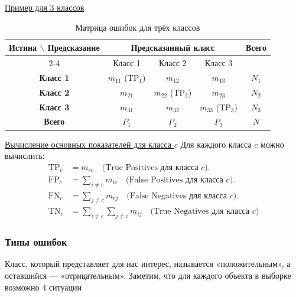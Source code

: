 \underline{Пример для 3 классов}

\begin{table}[h]
    \centering
    \begin{tabular}{|c|c|c|c|c|}
        \hline
        \multirow{2}{*}{\textbf{Истина $\backslash$ Предсказание}} & \multicolumn{3}{c|}{\textbf{Предсказанный класс}}
        & \multirow{2}{*}{\textbf{Всего}} \\ \cline{2-4}
        & Класс 1           & Класс 2           & Класс 3           &       \\ \hline
        \textbf{Класс 1} & $m_{11}$ (TP$_1$) & $m_{12}$          & $m_{13}$          & $N_1$ \\ \hline
        \textbf{Класс 2} & $m_{21}$          & $m_{22}$ (TP$_2$) & $m_{23}$          & $N_2$ \\ \hline
        \textbf{Класс 3} & $m_{31}$          & $m_{32}$          & $m_{33}$ (TP$_3$) & $N_3$ \\ \hline
        \textbf{Всего}   & $P_1$             & $P_2$             & $P_3$             & $N$   \\ \hline
    \end{tabular}
    \caption{Матрица ошибок для трёх классов}
    \label{tab:triple matrix}
\end{table}

\underline{Вычисление основных показателей для класса $c$}
Для каждого класса $c$ можно вычислить:
\begin{align*}
    \text{TP}_c &= m_{cc} \quad \text{(True Positives для класса $c$).} \\
    \text{FP}_c &= \sum_{i \neq c} m_{ic} \quad \text{(False Positives для класса $c$).} \\
    \text{FN}_c &= \sum_{j \neq c} m_{cj} \quad \text{(False Negatives для класса $c$).} \\
    \text{TN}_c &= \sum_{i \neq c} \sum_{j \neq c} m_{ij} \quad \text{(True Negatives для класса $c$)}
\end{align*}

\subsubsection{Типы ошибок}

Класс, который представляет для нас интерес, называется «положительным», а оставшийся — «отрицательным».
Заметим, что для каждого объекта в выборке возможно 4 ситуации


